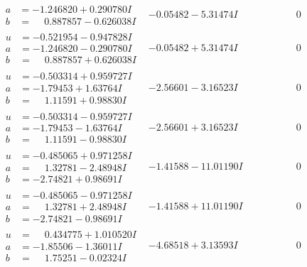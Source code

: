 \documentclass[1p]{elsarticle_modified}
\theoremstyle{definition}
\begin{document}
$$\begin{array}{c|c|c}
\begin{aligned}
a &= -1.246820 + 0.290780 I \\
b &= \phantom{-}0.887857 - 0.626038 I\end{aligned}
 & -0.05482 - 5.31474 I & \phantom{-0.000000 } 0 \\ \hline\begin{aligned}
u &= -0.521954 - 0.947828 I \\
a &= -1.246820 - 0.290780 I \\
b &= \phantom{-}0.887857 + 0.626038 I\end{aligned}
 & -0.05482 + 5.31474 I & \phantom{-0.000000 } 0 \\ \hline\begin{aligned}
u &= -0.503314 + 0.959727 I \\
a &= -1.79453 + 1.63764 I \\
b &= \phantom{-}1.11591 + 0.98830 I\end{aligned}
 & -2.56601 - 3.16523 I & \phantom{-0.000000 } 0 \\ \hline\begin{aligned}
u &= -0.503314 - 0.959727 I \\
a &= -1.79453 - 1.63764 I \\
b &= \phantom{-}1.11591 - 0.98830 I\end{aligned}
 & -2.56601 + 3.16523 I & \phantom{-0.000000 } 0 \\ \hline\begin{aligned}
u &= -0.485065 + 0.971258 I \\
a &= \phantom{-}1.32781 - 2.48948 I \\
b &= -2.74821 + 0.98691 I\end{aligned}
 & -1.41588 - 11.01190 I & \phantom{-0.000000 } 0 \\ \hline\begin{aligned}
u &= -0.485065 - 0.971258 I \\
a &= \phantom{-}1.32781 + 2.48948 I \\
b &= -2.74821 - 0.98691 I\end{aligned}
 & -1.41588 + 11.01190 I & \phantom{-0.000000 } 0 \\ \hline\begin{aligned}
u &= \phantom{-}0.434775 + 1.010520 I \\
a &= -1.85506 - 1.36011 I \\
b &= \phantom{-}1.75251 - 0.02324 I\end{aligned}
 & -4.68518 + 3.13593 I & \phantom{-0.000000 } 0 \\ \hline\begin{aligned}

\end{aligned}
\end{array}$$
\end{document}
